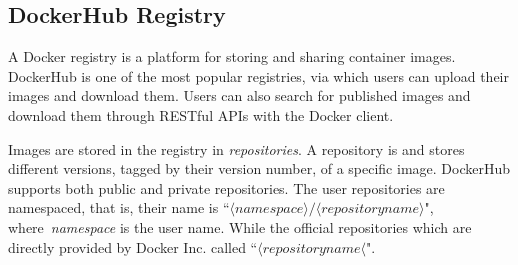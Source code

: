 









\subsection{DockerHub Registry}

A Docker registry is a platform for storing and sharing container
images. DockerHub is one of the most popular registries, via which users can upload
their images and download them. Users can
also search for published images and download them through RESTful APIs with the
Docker client.
%
%
%
%

Images are stored in the registry in \emph{repositories}. A repository is
 and stores different versions, tagged
by their version number, of a specific image. DockerHub supports both public and
private repositories.
The user repositories are namespaced, that is, their name is
``$\langle namespace\rangle/\langle repository name \rangle$",
where~\textit{namespace} is the user name. While the official repositories which
are directly provided by Docker Inc. called ``$\langle repository name \langle$".
%
%



